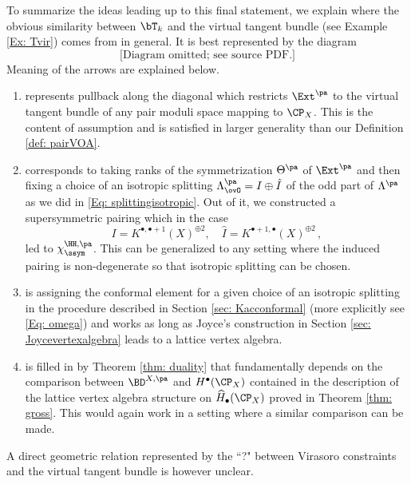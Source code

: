 \begin{remark}
\notready
\label{rem: obstructionvsvirasoro}
 To summarize the ideas leading up to this final statement, we explain where the obvious similarity between $\bT_k$ and the virtual tangent bundle (see Example \ref{Ex: Tvir}) comes from in general. It is best represented by the diagram
 $$
 \text{[Diagram omitted; see source PDF.]}
 $$
Meaning of the arrows are explained below.
 \begin{enumerate}[label = (\roman*)]
\item   represents pullback along the diagonal which restricts $\Ext^{\pa}$ to the virtual tangent bundle of any pair moduli space mapping to $\CP_X$. This is the content of assumption \cite[Assumption 4.4]{Jo21} and is satisfied in larger generality than our Definition \ref{def: pairVOA}.
\item  corresponds to taking ranks of the symmetrization $\Theta^{\pa}$ of $\Ext^{\pa}$ and then fixing a choice of an isotropic splitting  $\Lambda_{\ovO}^{\pa} = I\oplus \hat{I}$ of the odd part of $\Lambda^{\pa}$ as we did in \eqref{Eq: splittingisotropic}. Out of it, we constructed a supersymmetric pairing  which in the case
$$
I= K^{\bullet,\bullet+1}(X)^{\oplus 2},\quad \hat{I}= K^{\bullet+1,\bullet}(X)^{\oplus 2}\,,
$$
led to $\chi^{\HH,\pa}_{\ssym}$. This can be generalized to any setting where the induced pairing is non-degenerate so that isotropic splitting can be chosen.
\item is assigning the conformal element for a given choice of an isotropic splitting in the procedure described in Section \ref{sec: Kacconformal} (more explicitly see \eqref{Eq: omega}) and works as long as Joyce's construction in Section \ref{sec: Joycevertexalgebra} leads to a lattice vertex algebra.
\item is filled in by Theorem \ref{thm: duality} that fundamentally depends on the comparison between $\BD^{X,\pa}$ and $H^\bullet(\CP_{X})$ contained in the description of the lattice vertex algebra structure on $\widehat{H}_\bullet(\CP_X)$ proved in Theorem \ref{thm: gross}. This would again work in a setting where a similar comparison can be made.
 \end{enumerate}
 A direct geometric relation represented by the ``?" between Virasoro constraints and the virtual tangent bundle is however unclear.
\end{remark}


